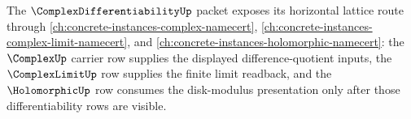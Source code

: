 The $\ComplexDifferentiabilityUp$ packet exposes its horizontal lattice route through \autoref{ch:concrete-instances-complex-namecert}, \autoref{ch:concrete-instances-complex-limit-namecert}, and \autoref{ch:concrete-instances-holomorphic-namecert}: the $\ComplexUp$ carrier row supplies the displayed difference-quotient inputs, the $\ComplexLimitUp$ row supplies the finite limit readback, and the $\HolomorphicUp$ row consumes the disk-modulus presentation only after those differentiability rows are visible.
